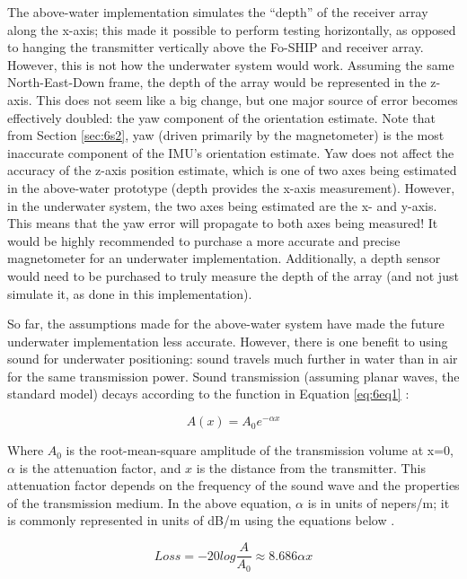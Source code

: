 \documentclass[12pt,a4paper]{report}
\begin{document}
The above-water implementation simulates the “depth” of the receiver array along the x-axis; this made it possible to perform testing horizontally, as opposed to hanging the transmitter vertically above the Fo-SHIP and receiver array. However, this is not how the underwater system would work. Assuming the same North-East-Down frame, the depth of the array would be represented in the z-axis. This does not seem like a big change, but one major source of error becomes effectively doubled: the yaw component of the orientation estimate. Note that from Section \ref{sec:6s2}, yaw (driven primarily by the magnetometer) is the most inaccurate component of the IMU’s orientation estimate. Yaw does not affect the accuracy of the z-axis position estimate, which is one of two axes being estimated in the above-water prototype (depth provides the x-axis measurement). However, in the underwater system, the two axes being estimated are the x- and y-axis. This means that the yaw error will propagate to both axes being measured! It would be highly recommended to purchase a more accurate and precise magnetometer for an underwater implementation. Additionally, a depth sensor would need to be purchased to truly measure the depth of the array (and not just simulate it, as done in this implementation).

So far, the assumptions made for the above-water system have made the future underwater implementation less accurate. However, there is one benefit to using sound for underwater positioning: sound travels much further in water than in air for the same transmission power. Sound transmission (assuming planar waves, the standard model) decays according to the function in Equation \ref{eq:6eq1} \cite{computational}:

\begin{equation} \label{eq:6eq1}
	A(x) = A_0 e^{-\alpha x}
\end{equation}

Where \(A_0\) is the root-mean-square amplitude of the transmission volume at x=0, \(\alpha\) is the attenuation factor, and \(x\) is the distance from the transmitter. This attenuation factor depends on the frequency of the sound wave and the properties of the transmission medium. In the above equation, \(\alpha\) is in units of nepers/m; it is commonly represented in units of dB/m using the equations below \cite{computational}.

\begin{equation} \label{eq:6eq2}
	Loss = -20log\frac{A}{A_0} \approx 8.686 \alpha x
\end{equation}
\end{document}
